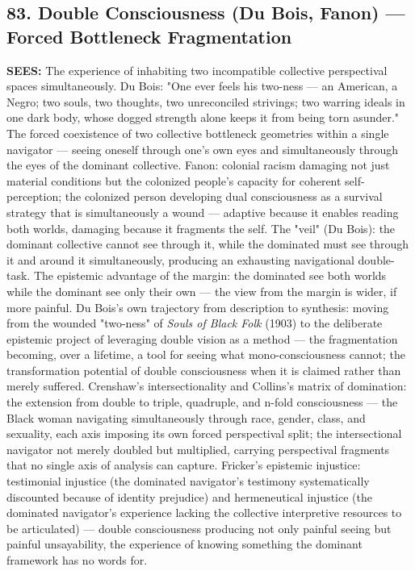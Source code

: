\subsection*{83. Double Consciousness (Du Bois, Fanon) — Forced Bottleneck Fragmentation}


\textbf{SEES:} The experience of inhabiting two incompatible collective perspectival spaces simultaneously. Du Bois: "One ever feels his two-ness — an American, a Negro; two souls, two thoughts, two unreconciled strivings; two warring ideals in one dark body, whose dogged strength alone keeps it from being torn asunder." The forced coexistence of two collective bottleneck geometries within a single navigator — seeing oneself through one's own eyes and simultaneously through the eyes of the dominant collective. Fanon: colonial racism damaging not just material conditions but the colonized people's capacity for coherent self-perception; the colonized person developing dual consciousness as a survival strategy that is simultaneously a wound — adaptive because it enables reading both worlds, damaging because it fragments the self. The "veil" (Du Bois): the dominant collective cannot see through it, while the dominated must see through it and around it simultaneously, producing an exhausting navigational double-task. The epistemic advantage of the margin: the dominated see both worlds while the dominant see only their own — the view from the margin is wider, if more painful. Du Bois's own trajectory from description to synthesis: moving from the wounded "two-ness" of \textit{Souls of Black Folk} (1903) to the deliberate epistemic project of leveraging double vision as a method — the fragmentation becoming, over a lifetime, a tool for seeing what mono-consciousness cannot; the transformation potential of double consciousness when it is claimed rather than merely suffered. Crenshaw's intersectionality and Collins's matrix of domination: the extension from double to triple, quadruple, and n-fold consciousness — the Black woman navigating simultaneously through race, gender, class, and sexuality, each axis imposing its own forced perspectival split; the intersectional navigator not merely doubled but multiplied, carrying perspectival fragments that no single axis of analysis can capture. Fricker's epistemic injustice: testimonial injustice (the dominated navigator's testimony systematically discounted because of identity prejudice) and hermeneutical injustice (the dominated navigator's experience lacking the collective interpretive resources to be articulated) — double consciousness producing not only painful seeing but painful unsayability, the experience of knowing something the dominant framework has no words for.


